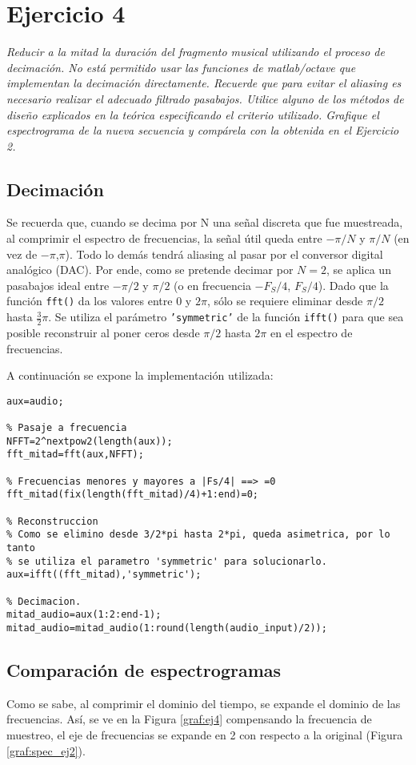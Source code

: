 

\section{Ejercicio 4}	\label{ej4}
	\begin{flushleft}
	\textit{Reducir a la mitad la duración del fragmento musical utilizando el proceso de decimación.
No está permitido usar las funciones de matlab/octave que implementan la decimación
directamente. Recuerde que para evitar el aliasing es necesario realizar el adecuado filtrado
pasabajos. Utilice alguno de los métodos de diseño explicados en la teórica especificando el
criterio utilizado. Grafique el espectrograma de la nueva secuencia y compárela con la obtenida
en el Ejercicio 2.}
	\end{flushleft}

	\subsection{Decimación}
	Se recuerda que, cuando se decima por N una señal discreta que fue muestreada, al comprimir el espectro de frecuencias, la señal útil queda entre $-\pi/N$ y $\pi/N$ (en vez de $-\pi$,$\pi$). Todo lo demás tendrá aliasing al pasar por el conversor digital analógico (DAC). Por ende, como se pretende decimar por $N=2$, se aplica un pasabajos ideal entre $-\pi/2$ y $\pi/2$ (o en frecuencia $-F_S/4$, $F_S/4$). Dado que la función \texttt{fft()} da los valores entre 0 y $2\pi$, sólo se requiere eliminar desde $\pi/2$ hasta $\frac{3}{2}\pi$. Se utiliza el parámetro \texttt{'symmetric'} de la función \texttt{ifft()} para que sea posible reconstruir al poner ceros desde $\pi/2$ hasta $2\pi$ en el espectro de frecuencias.

		A continuación se expone la implementación utilizada:
		\begin{lstlisting}
aux=audio;

% Pasaje a frecuencia
NFFT=2^nextpow2(length(aux));
fft_mitad=fft(aux,NFFT);

% Frecuencias menores y mayores a |Fs/4| ==> =0
fft_mitad(fix(length(fft_mitad)/4)+1:end)=0;

% Reconstruccion
% Como se elimino desde 3/2*pi hasta 2*pi, queda asimetrica, por lo tanto
% se utiliza el parametro 'symmetric' para solucionarlo.
aux=ifft((fft_mitad),'symmetric');

% Decimacion.
mitad_audio=aux(1:2:end-1);
mitad_audio=mitad_audio(1:round(length(audio_input)/2));
		\end{lstlisting}


	\subsection{Comparación de espectrogramas}

	Como se sabe, al comprimir el dominio del tiempo, se expande el dominio de las frecuencias. Así, se ve en la Figura \ref{graf:ej4} compensando la frecuencia de muestreo, el eje de frecuencias se expande en 2 con respecto a la original (Figura \ref{graf:spec_ej2}).


